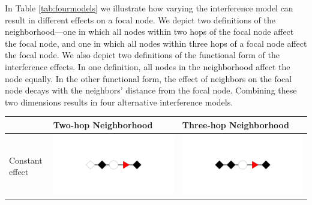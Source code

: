 \documentclass[12pt]{article}
\begin{document}
In Table \ref{tab:fourmodels} we illustrate how varying the interference model can result in different effects on a focal node. We depict two definitions of the neighborhood---one in which all nodes within two hops of the focal node affect the focal node, and one in which all nodes within three hops of a focal node affect the focal node. We also depict two definitions of the functional form of the interference effects. In one definition, all nodes in the neighborhood affect the node equally. In the other functional form, the effect of neighbors on the focal node decays with the neighbors' distance from the focal node. Combining these two dimensions results in four alternative interference models. 

\begin{table}[h]
\centering
\begin{tabular}{|>{\centering\arraybackslash}m{2.75cm}|>{\centering\arraybackslash}m{5.5cm}|>{\centering\arraybackslash}m{5.5cm}|}
\hline 
& Two-hop Neighborhood & Three-hop Neighborhood \\
\hline
Constant effect  & \includegraphics[scale=.225,clip=true,trim = 13cm 10cm 13cm 10cm]{./images/effect_constant_twohops} &  \includegraphics[scale=.225,clip=true,trim = 13cm 10cm 13cm 10cm]{./images/effect_constant_threehops} \\ \hline 

\end{tabular}
\end{table}
\end{document}
